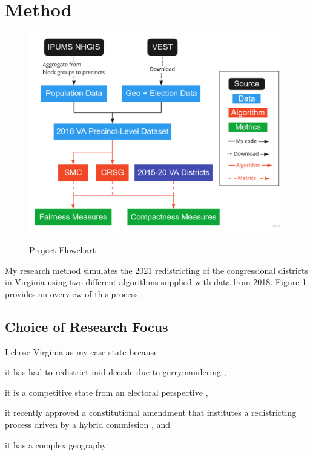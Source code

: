 \section{Method}
\label{sec:method}

\begin{figure}[H]
    \caption{Project Flowchart}
    \includegraphics[width=0.85\linewidth]{img/flowchart.pdf}
    \label{fig:flowchart}
    \raggedright
\end{figure}  

My research method simulates the 2021 redistricting of the congressional districts in Virginia using two different algorithms supplied with data from 2018. Figure \ref{fig:flowchart} provides an overview of this process.

\subsection{Choice of Research Focus}

I chose Virginia as my case state because 
\begin{seriate}
    \item it has had to redistrict mid-decade due to gerrymandering \parencite[see][]{2016a},
    \item it is a competitive state from an electoral perspective \parencite{virginiadeparmentofelections2021}, 
    \item it recently approved a constitutional amendment that institutes a redistricting process driven by a hybrid commission \parencite{ballotpedia2020}, and
    \item it has a complex geography.
\end{seriate}


